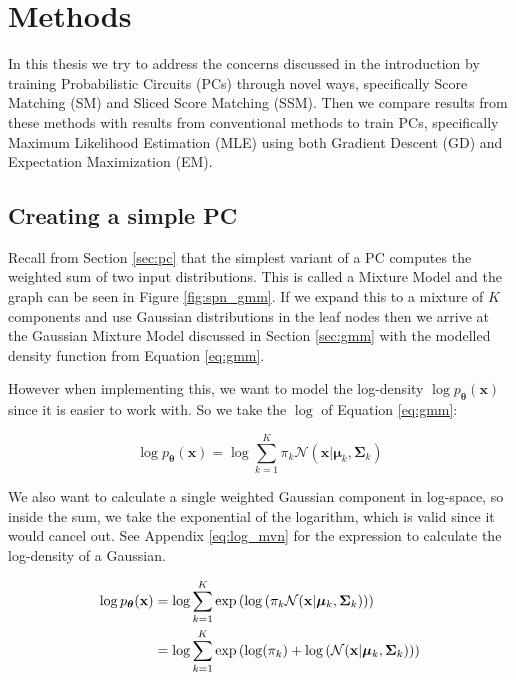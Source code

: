 \renewcommand{\vec}[1]{\textbf{#1}}
\renewcommand{\norm}[1]{\left\lVert#1\right\rVert}

\chapter{Methods}
\label{cha:methods}

In this thesis we try to address the concerns discussed in the introduction by training 
Probabilistic Circuits (PCs) through novel ways, specifically Score Matching (SM) and Sliced Score Matching (SSM).
Then we compare results from these methods with results from conventional methods to train PCs, specifically Maximum Likelihood Estimation (MLE) using both Gradient Descent (GD) and Expectation Maximization (EM). \\

\section{Creating a simple PC}
\label{sec:simple_pc}

Recall from Section \ref{sec:pc} that the simplest variant of a PC computes the weighted sum of two input distributions. This is 
called a Mixture Model and the graph can be seen in Figure \ref{fig:spn_gmm}. If we expand this to a mixture 
of $K$ components and use Gaussian distributions in the leaf nodes then we arrive at the Gaussian Mixture Model 
discussed in Section \ref{sec:gmm} with the modelled density function from Equation \ref{eq:gmm}.

However when implementing this, we want to model the log-density $\log p_{\boldsymbol{\theta}}(\vec x)$ since it is easier to work with. So 
we take the $\log$ of Equation \ref{eq:gmm}:

\begin{equation}
    \log p_{\boldsymbol{\theta}}(\vec x) = \log \sum_{k=1}^K \pi_k \mathcal{N}(\vec x|\boldsymbol{\mu}_k, \boldsymbol{\Sigma}_k) 
    \label{eq:gmm_log}
\end{equation}

We also want to calculate a single weighted Gaussian component in log-space, so inside the sum, we take 
the exponential of the logarithm, which is valid since it would cancel out. See Appendix \ref{eq:log_mvn} for the expression
to calculate the log-density of a Gaussian. 

\begin{align}
    \log p_{\boldsymbol{\theta}}(\vec x) & = \log \sum_{k=1}^K \exp \left( \log \left(\pi_k \mathcal{N}(\vec x|\boldsymbol{\mu}_k, \boldsymbol{\Sigma}_k) \right) \right) \notag \\
    & = \log \sum_{k=1}^K \exp \left( \log (\pi_k) + \log \left( \mathcal{N}(\vec x|\boldsymbol{\mu}_k, \boldsymbol{\Sigma}_k) \right) \right)
    \label{eq:gmm_log2}
\end{align}


